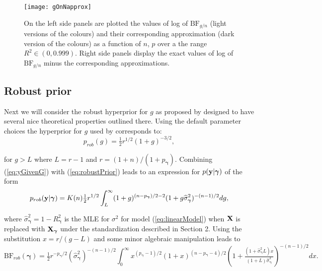 \documentclass[12pt]{article}
\def\vectorfontone{\bf}
\def\vectorfonttwo{\boldsymbol}
\def\vy{{\vectorfontone y}}                      %
\def\vgamma{{\vectorfonttwo \gamma}}             %
\def\matrixfontone{\bf}
\def\mX{{\matrixfontone X}}                      %
\def\ds{\displaystyle}
\begin{document}
\begin{figure}
	\centering
	\texttt{[image: gOnNapprox]}
	\caption{On the left side panels are plotted the values of log of $\mbox{BF}_{g/n}$ (light versions of the
		colours) and their corresponding approximation (dark version of the colours) 
		as a function of $n$, $p$ over a the range $R^2\in(0,0.999)$. Right side panels display
		the exact values of log of $\mbox{BF}_{g/n}$ minus the corresponding approximations.}
	\label{fig:gonnapprox}
\end{figure}


\subsection{Robust prior}  

Next we will consider the robust hyperprior for $g$ as proposed by \cite{Bayarri2012} designed to have several nice theoretical
properties outlined there. Using the default parameter
choices the hyperprior 
for $g$ used by \cite{Bayarri2012} corresponds to:
\begin{equation}\label{eq:robustPrior}
p_{{rob}}(g) = \tfrac{1}{2}r^{1/2} (1 + g)^{-3/2},
\end{equation}
 
\noindent for $g>L$  where $L = r - 1$ and $r = (1 + n)/(1 + p_\vgamma)$. 
Combining (\ref{eq:yGivenG}) with (\ref{eq:robustPrior})
leads to an expression for $p(\vy|\vgamma)$ of the form
\begin{equation}\label{eq:marginalLikelihoodRobust}
\ds p_{rob}(\vy|\vgamma)
\ds = K(n) \tfrac{1}{2} r^{1/2} 
\int_L^\infty  (1 + g)^{(n - p_\vgamma)/2 - 2}(  1 + g \widehat{\sigma}_\vgamma^2)^{-(n-1)/2} dg,
\end{equation}

\noindent where $\widehat{\sigma}_\vgamma^2 = 1 - R_\vgamma^2$ is the MLE
for $\sigma^2$ for model (\ref{eq:linearModel}) when $\mX$ is replaced with $\mX_\vgamma$ under the standardization described in Section 2.
Using the substitution 
$x = r/(g - L)$ and some minor algebraic
manipulation leads to
%
$$
\ds \mbox{BF}_{{rob}}(\vgamma)
\ds = \tfrac{1}{2} r^{ - p_\vgamma/2} (\widehat{\sigma}_\vgamma^2)^{-(n-1)/2}
\int_0^\infty x^{(p_\vgamma-1)/2} 
(1 + x)^{(n - p_\vgamma - 4)/2}
\left( 1 + \tfrac{(1 + \widehat{\sigma}_\vgamma^2 L)x}{(1 + L)\widehat{\sigma}_\vgamma^2}  \right)^{-(n-1)/2}  dx.
$$
\end{document}
